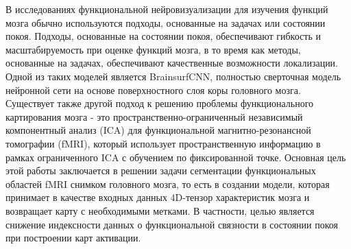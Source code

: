 В исследованиях функциональной нейровизуализации для изучения функций мозга обычно используются подходы, основанные на задачах или состоянии покоя. 
Подходы, основанные на состоянии покоя, обеспечивают гибкость и масштабируемость при оценке функций мозга, в то время как методы, основанные на задачах, обеспечивают качественные возможности локализации. 
Одной из таких моделей является BrainsurfCNN, полностью сверточная модель нейронной сети на основе поверхностного слоя коры головного мозга. 
Существует также другой подход к решению проблемы функционального картирования мозга - это пространственно-ограниченный независимый компонентный анализ (ICA) для функциональной магнитно-резонансной томографии (fMRI), который использует пространственную информацию в рамках ограниченного ICA с обучением по фиксированной точке. 
Основная цель этой работы заключается в решении задачи сегментации функциональных областей fMRI снимком головного мозга, то есть в создании модели, которая принимает в качестве входных данных 4D-тензор характеристик мозга и возвращает карту с необходимыми метками. 
В частности, целью является снижение индексности данных о функциональной связности в состоянии покоя при построении карт активации.

